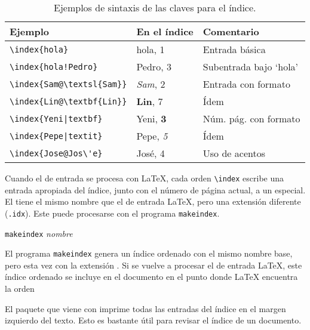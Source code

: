 \begin{table}[!tp]
\caption{Ejemplos de sintaxis de las claves para el índice.}
\label{index}
\begin{center}
\begin{tabular}{@{}lll@{}}
  \textbf{Ejemplo} &\textbf{En el índice} &\textbf{Comentario}\\\hline
  \rule{0pt}{1.05em}\verb|\index{hola}| & hola, 1 & Entrada básica\\ 
\verb|\index{hola!Pedro}|       & \hspace*{2ex}Pedro, 3 & Subentrada bajo `hola'\\ 
\verb|\index{Sam@\textsl{Sam}}|     & \textsl{Sam}, 2    & Entrada con formato\\ 
\verb|\index{Lin@\textbf{Lin}}|     & \textbf{Lin}, 7    & Ídem\\ 
\verb.\index{Yeni|textbf}.        & Yeni, \textbf{3}     & Núm. pág. con formato\\
\verb.\index{Pepe|textit}.        & Pepe, \textit{5}     & Ídem\\
\verb.\index{Jose@Jos\'e}.        & Jos\'e, 4        & Uso de acentos
\end{tabular}
\end{center}
\end{table}

Cuando el \filenomo{} de entrada se procesa con \LaTeX{}, cada orden \verb|\index| escribe una entrada apropiada del índice, junto con el número de página actual, a un \filenomo{} especial.  El \filenomo{} tiene el mismo nombre que el \filenomo{} de entrada \LaTeX{}, pero una extensión diferente (\verb|.idx|).  Este \filenomo{}  puede procesarse con el programa \texttt{makeindex}.

\begin{lscommand}
  \texttt{makeindex} \emph{nombre\filenomo{}}
\end{lscommand}

El programa \texttt{makeindex} genera un índice ordenado con el mismo nombre base, pero esta vez con la extensión .  Si se vuelve a procesar el \filenomo{} de entrada \LaTeX{}, este índice ordenado se incluye en el documento en el punto donde  \LaTeX{} encuentra la orden
\begin{lscommand}
\end{lscommand}

El paquete  que viene con \LaTeXe{} imprime todas las entradas del índice en el margen izquierdo del texto.  Esto es bastante útil para revisar el índice de un documento.

